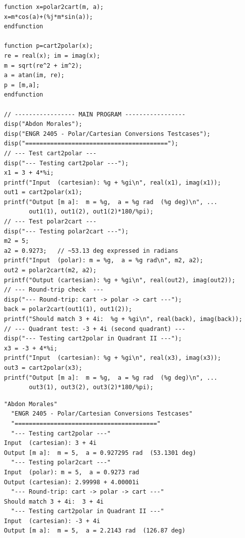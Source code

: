 \documentclass[11pt]{article}
\begin{document}
\begin{lstlisting}[style=scilab, caption={SciLab Part I}]
%j=%i
function x=polar2cart(m, a); 
x=m*cos(a)+(%j*m*sin(a)); 
endfunction

function p=cart2polar(x);
re = real(x); im = imag(x);
m = sqrt(re^2 + im^2);
a = atan(im, re);
p = [m,a];
endfunction

// ----------------- MAIN PROGRAM -----------------
disp("Abdon Morales");
disp("ENGR 2405 - Polar/Cartesian Conversions Testcases");
disp("========================================");
// --- Test cart2polar ---
disp("--- Testing cart2polar ---");
x1 = 3 + 4*%i;
printf("Input  (cartesian): %g + %gi\n", real(x1), imag(x1));
out1 = cart2polar(x1);
printf("Output [m a]:  m = %g,  a = %g rad  (%g deg)\n", ...
       out1(1), out1(2), out1(2)*180/%pi);
// --- Test polar2cart ---
disp("--- Testing polar2cart ---");
m2 = 5;
a2 = 0.9273;   // ~53.13 deg expressed in radians
printf("Input  (polar): m = %g,  a = %g rad\n", m2, a2);
out2 = polar2cart(m2, a2);
printf("Output (cartesian): %g + %gi\n", real(out2), imag(out2));
// --- Round-trip check  ---
disp("--- Round-trip: cart -> polar -> cart ---");
back = polar2cart(out1(1), out1(2));
printf("Should match 3 + 4i:  %g + %gi\n", real(back), imag(back));
// --- Quadrant test: -3 + 4i (second quadrant) ---
disp("--- Testing cart2polar in Quadrant II ---");
x3 = -3 + 4*%i;
printf("Input  (cartesian): %g + %gi\n", real(x3), imag(x3));
out3 = cart2polar(x3);
printf("Output [m a]:  m = %g,  a = %g rad  (%g deg)\n", ...
       out3(1), out3(2), out3(2)*180/%pi);
\end{lstlisting}

\begin{lstlisting}[caption={SciLab Part I runtime output}]
  "Abdon Morales"
  "ENGR 2405 - Polar/Cartesian Conversions Testcases"
  "========================================"
  "--- Testing cart2polar ---"
Input  (cartesian): 3 + 4i
Output [m a]:  m = 5,  a = 0.927295 rad  (53.1301 deg)
  "--- Testing polar2cart ---"
Input  (polar): m = 5,  a = 0.9273 rad
Output (cartesian): 2.99998 + 4.00001i
  "--- Round-trip: cart -> polar -> cart ---"
Should match 3 + 4i:  3 + 4i
  "--- Testing cart2polar in Quadrant II ---"
Input  (cartesian): -3 + 4i
Output [m a]:  m = 5,  a = 2.2143 rad  (126.87 deg)
\end{lstlisting}
\end{document}
